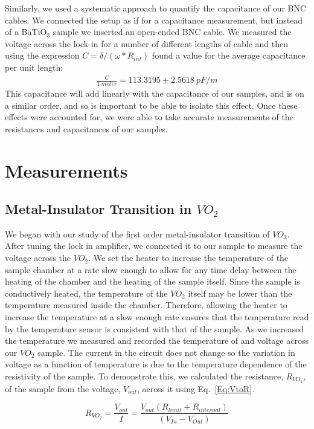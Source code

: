 \documentclass[%
 reprint,
 amsmath,amssymb,
 aps,
 pra,
]{revtex4-1}
\begin{document}
Similarly, we used a systematic approach to quantify the capacitance of our BNC cables. We connected the setup as if for a capacitance measurement, but instead of a BaTiO$_3$ sample we inserted an open-ended BNC cable. We measured the voltage across the lock-in for a number of different lengths of cable and then using the expression $C = \delta/(\omega*R_{int})$ found a value for the average capacitance per unit length:
\begin{gather}
	\frac{C}{1~meter} = 113.3195 \pm 2.5618~pF/m \nonumber
\end{gather}
This capacitance will add linearly with the capacitance of our samples, and is on a similar order, and so is important to be able to isolate this effect. Once these effects were accounted for, we were able to take accurate measurements of the resistances and capacitances of our samples.

\section{Measurements}
\subsection{Metal-Insulator Transition in $VO_{2}$}
We began with our study of the first order metal-insulator transition of $VO_{2}$. After tuning the lock in amplifier, we connected it to our sample to measure the voltage across the $VO_{2}$. We set the heater to increase the temperature of the sample chamber at a rate slow enough to allow for any time delay between the heating of the chamber and the heating of the sample itself. Since the sample is conductively heated, the temperature of the $VO_{2}$ itself may be lower than the temperature measured inside the chamber. Therefore, allowing the heater to increase the temperature at a slow enough rate ensures that the temperature read by the temperature sensor is consistent with that of the sample. As we increased the temperature we measured and recorded the temperature of and voltage across our $VO_{2}$ sample. The current in the circuit does not change so the variation in voltage as a function of temperature is due to the temperature dependence of the resistivity of the sample. To demonstrate this, we calculated the resistance, $R_{VO_{2}}$, of the sample from the voltage, $V_{out}$, across it using Eq.~\ref{Eq:VtoR}.

\begin{equation}\label{Eq:VtoR}
R_{VO_{2}} = \frac{V_{out}}{I} = \frac{V_{out} (R_{limit} + R_{internal})}{(V_{In} - V_{Out})} 
\end{equation}
\end{document}
